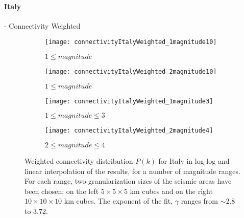 \paragraph{Italy} - Connectivity Weighted
\begin{figure}[!h]
\begin{subfigure}{.99\textwidth}
  \centering
  \texttt{[image: connectivityItalyWeighted\_1magnitude10]}
  \caption{$1 \leq magnitude$}
  \label{fig:conWeiIt1mag10}
\end{subfigure}%

\begin{subfigure}{.99\textwidth}
  \centering
  \texttt{[image: connectivityItalyWeighted\_2magnitude10]}
  \caption{$1 \leq magnitude$}
  \label{fig:conWeiIt2mag10}
\end{subfigure}%

\begin{subfigure}{.99\textwidth}
  \centering
  \texttt{[image: connectivityItalyWeighted\_1magnitude3]}
  \caption{$1 \leq magnitude \leq 3$}
  \label{fig:conWeiIt1mag3}
\end{subfigure}%

\begin{subfigure}{.99\textwidth}
  \centering
  \texttt{[image: connectivityItalyWeighted\_2magnitude4]}
  \caption{$2 \leq magnitude \leq 4$}
  \label{fig:conWeiIt2mag4}
\end{subfigure}%

\caption{Weighted connectivity distribution $P(k)$ for Italy in log-log and linear interpolation of the results, for a number of magnitude ranges. For each range, two granularization sizes of the seismic areas have been chosen: on the left $5 \times 5 \times5 $ km cubes and on the right $10 \times 10 \times 10$ km cubes. The exponent of the fit, $\gamma$ ranges from $\sim 2.8$ to $3.72$.}
\label{fig:connectivityItWeighted}
\end{figure}


\clearpage
